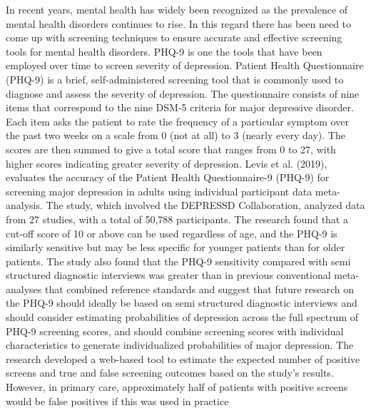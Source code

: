 \documentclass[12pt]{article}
\begin{document}
In recent years, mental health has widely been recognized as the prevalence of mental health disorders continues to rise. In this regard there has been need to come up with screening techniques to ensure accurate and effective screening tools for mental health disorders. PHQ-9 is one the tools that have been employed over time to screen severity of depression. Patient Health Questionnaire (PHQ-9) is a brief, self-administered screening tool that is commonly used to diagnose and assess the severity of depression. The questionnaire consists of nine items that correspond to the nine DSM-5 criteria for major depressive disorder. Each item asks the patient to rate the frequency of a particular symptom over the past two weeks on a scale from 0 (not at all) to 3 (nearly every day). The scores are then summed to give a total score that ranges from 0 to 27, with higher scores indicating greater severity of depression. 
Levis et al. (2019), evaluates the accuracy of the Patient Health Questionnaire-9 (PHQ-9) for screening major depression in adults using individual participant data meta-analysis. The study, which involved the DEPRESSD Collaboration, analyzed data from 27 studies, with a total of 50,788 participants. The research found that a cut-off score of 10 or above can be used regardless of age, and the PHQ-9 is similarly sensitive but may be less specific for younger patients than for older patients. The study also found that the PHQ-9 sensitivity compared with semi structured diagnostic interviews was greater than in previous conventional meta-analyses that combined reference standards and suggest that future research on the PHQ-9 should ideally be based on semi structured diagnostic interviews and should consider estimating probabilities of depression across the full spectrum of PHQ-9 screening scores, and should combine screening scores with individual characteristics to generate individualized probabilities of major depression. The research developed a web-based tool to estimate the expected number of positive screens and true and false screening outcomes based on the study's results. However, in primary care, approximately half of patients with positive screens would be false positives if this was used in practice
\end{document}
